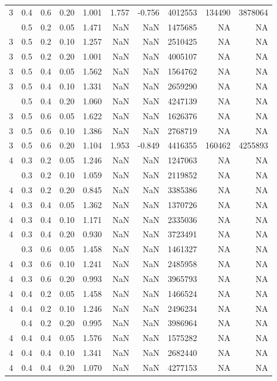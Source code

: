 \documentclass[
]{article}
\begin{document}
\begin{longtable}[t]{rrrrrrrrrr}
3 & 0.4 & 0.6 & 0.20 & 1.001 & 1.757 & -0.756 & 4012553 & 134490 & 3878064\\
\addlinespace
3 & 0.5 & 0.2 & 0.05 & 1.471 & NaN & NaN & 1475685 & NA & NA\\
3 & 0.5 & 0.2 & 0.10 & 1.257 & NaN & NaN & 2510425 & NA & NA\\
3 & 0.5 & 0.2 & 0.20 & 1.001 & NaN & NaN & 4005107 & NA & NA\\
3 & 0.5 & 0.4 & 0.05 & 1.562 & NaN & NaN & 1564762 & NA & NA\\
3 & 0.5 & 0.4 & 0.10 & 1.331 & NaN & NaN & 2659290 & NA & NA\\
\addlinespace
3 & 0.5 & 0.4 & 0.20 & 1.060 & NaN & NaN & 4247139 & NA & NA\\
3 & 0.5 & 0.6 & 0.05 & 1.622 & NaN & NaN & 1626376 & NA & NA\\
3 & 0.5 & 0.6 & 0.10 & 1.386 & NaN & NaN & 2768719 & NA & NA\\
3 & 0.5 & 0.6 & 0.20 & 1.104 & 1.953 & -0.849 & 4416355 & 160462 & 4255893\\
4 & 0.3 & 0.2 & 0.05 & 1.246 & NaN & NaN & 1247063 & NA & NA\\
\addlinespace
4 & 0.3 & 0.2 & 0.10 & 1.059 & NaN & NaN & 2119852 & NA & NA\\
4 & 0.3 & 0.2 & 0.20 & 0.845 & NaN & NaN & 3385386 & NA & NA\\
4 & 0.3 & 0.4 & 0.05 & 1.362 & NaN & NaN & 1370726 & NA & NA\\
4 & 0.3 & 0.4 & 0.10 & 1.171 & NaN & NaN & 2335036 & NA & NA\\
4 & 0.3 & 0.4 & 0.20 & 0.930 & NaN & NaN & 3723491 & NA & NA\\
\addlinespace
4 & 0.3 & 0.6 & 0.05 & 1.458 & NaN & NaN & 1461327 & NA & NA\\
4 & 0.3 & 0.6 & 0.10 & 1.241 & NaN & NaN & 2485958 & NA & NA\\
4 & 0.3 & 0.6 & 0.20 & 0.993 & NaN & NaN & 3965793 & NA & NA\\
4 & 0.4 & 0.2 & 0.05 & 1.458 & NaN & NaN & 1466524 & NA & NA\\
4 & 0.4 & 0.2 & 0.10 & 1.246 & NaN & NaN & 2496234 & NA & NA\\
\addlinespace
4 & 0.4 & 0.2 & 0.20 & 0.995 & NaN & NaN & 3986964 & NA & NA\\
4 & 0.4 & 0.4 & 0.05 & 1.576 & NaN & NaN & 1575282 & NA & NA\\
4 & 0.4 & 0.4 & 0.10 & 1.341 & NaN & NaN & 2682440 & NA & NA\\
4 & 0.4 & 0.4 & 0.20 & 1.070 & NaN & NaN & 4277153 & NA & NA\\

\end{longtable}
\end{document}
